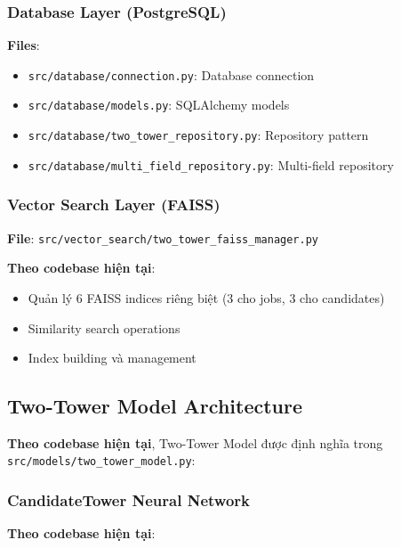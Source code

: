 \subsubsection{Database Layer (PostgreSQL)}

\textbf{Files}:
\begin{itemize}
    \item \texttt{src/database/connection.py}: Database connection
    \item \texttt{src/database/models.py}: SQLAlchemy models
    \item \texttt{src/database/two\_tower\_repository.py}: Repository pattern
    \item \texttt{src/database/multi\_field\_repository.py}: Multi-field repository
\end{itemize}

\subsubsection{Vector Search Layer (FAISS)}

\textbf{File}: \texttt{src/vector\_search/two\_tower\_faiss\_manager.py}

\textbf{Theo codebase hiện tại}:
\begin{itemize}
    \item Quản lý 6 FAISS indices riêng biệt (3 cho jobs, 3 cho candidates)
    \item Similarity search operations
    \item Index building và management
\end{itemize}

\subsection{Two-Tower Model Architecture}

\textbf{Theo codebase hiện tại}, Two-Tower Model được định nghĩa trong \texttt{src/models/two\_tower\_model.py}:

\subsubsection{CandidateTower Neural Network}

\textbf{Theo codebase hiện tại}:


